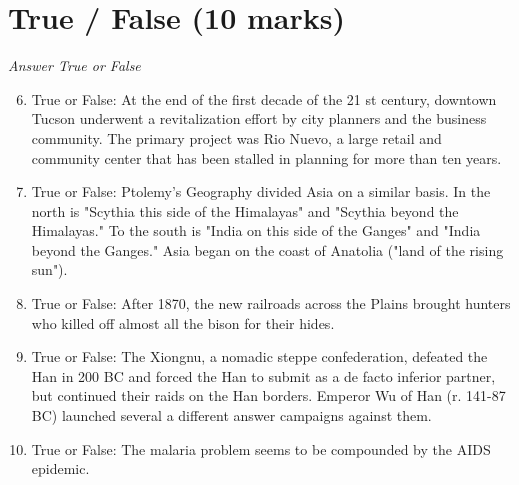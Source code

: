 \documentclass[12pt]{article}
\begin{document}
\section*{True / False (10 marks)}
\textit{Answer True or False}
\begin{enumerate}[label=\arabic*.]
\setcounter{enumi}{5}
\item True or False: At the end of the first decade of the 21 st century, downtown Tucson underwent a revitalization effort by city planners and the business community. The primary project was Rio Nuevo, a large retail and community center that has been stalled in planning for more than ten years.
\item True or False: Ptolemy's Geography divided Asia on a similar basis. In the north is "Scythia this side of the Himalayas" and "Scythia beyond the Himalayas." To the south is "India on this side of the Ganges" and "India beyond the Ganges." Asia began on the coast of Anatolia ("land of the rising sun").
\item True or False: After 1870, the new railroads across the Plains brought hunters who killed off almost all the bison for their hides.
\item True or False: The Xiongnu, a nomadic steppe confederation, defeated the Han in 200 BC and forced the Han to submit as a de facto inferior partner, but continued their raids on the Han borders. Emperor Wu of Han (r. 141-87 BC) launched several a different answer campaigns against them.
\item True or False: The malaria problem seems to be compounded by the AIDS epidemic.
\end{enumerate}
\end{document}
